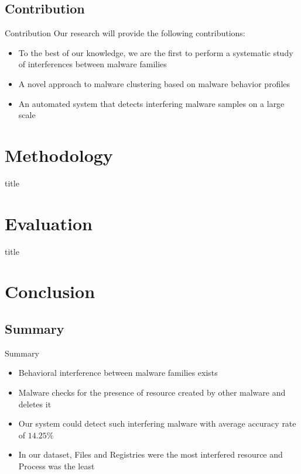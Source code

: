 \documentclass[]{beamer}
\begin{document}
\subsection{Contribution}
\label{sub:Contribution}
\begin{frame}[t]{Contribution}
Our research will provide the following contributions:
\begin{itemize}
  \item To the best of our knowledge, we are the first to perform a systematic study of interferences between malware families\\
  \item A novel approach to malware clustering based on malware behavior profiles
  \item An automated system that detects interfering malware samples on a large scale
\end{itemize}
\end{frame}
\section{Methodology}
\label{sec:Methodology}
\begin{frame}[t]{title}
  
\end{frame}

\section{Evaluation}
\label{sec:Evaluation}
\begin{frame}[t]{title}
  
\end{frame}

\section{Conclusion}
\subsection{Summary}
\label{sub:Summary}
\begin{frame}[t]{Summary}
  \begin{itemize}
    \item Behavioral interference between malware families exists
    \item Malware checks for the presence of resource created by other malware and deletes it
    \item Our system could detect such interfering malware with average accuracy rate of $14.25\%$
    \item In our dataset, Files and Registries were the most interfered resource and Process was the least
  \end{itemize}
\end{frame}
\end{document}
